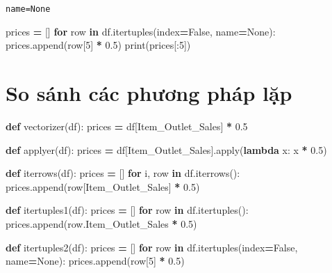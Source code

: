 \documentclass[
]{book}
\newenvironment{Shaded}{\begin{snugshade}}{\end{snugshade}}
\newcommand{\BuiltInTok}[1]{#1}
\newcommand{\ControlFlowTok}[1]{\textcolor[rgb]{0.13,0.29,0.53}{\textbf{#1}}}
\newcommand{\DecValTok}[1]{\textcolor[rgb]{0.00,0.00,0.81}{#1}}
\newcommand{\FloatTok}[1]{\textcolor[rgb]{0.00,0.00,0.81}{#1}}
\newcommand{\KeywordTok}[1]{\textcolor[rgb]{0.13,0.29,0.53}{\textbf{#1}}}
\newcommand{\NormalTok}[1]{#1}
\newcommand{\OperatorTok}[1]{\textcolor[rgb]{0.81,0.36,0.00}{\textbf{#1}}}
\newcommand{\StringTok}[1]{\textcolor[rgb]{0.31,0.60,0.02}{#1}}
\newcommand{\VariableTok}[1]{\textcolor[rgb]{0.00,0.00,0.00}{#1}}
\begin{document}
\texttt{name=None}

\begin{Shaded}
\begin{Highlighting}[]
\NormalTok{prices }\OperatorTok{=}\NormalTok{ []}
\ControlFlowTok{for}\NormalTok{ row }\KeywordTok{in}\NormalTok{ df.itertuples(index}\OperatorTok{=}\VariableTok{False}\NormalTok{, name}\OperatorTok{=}\VariableTok{None}\NormalTok{):}
\NormalTok{    prices.append(row[}\DecValTok{5}\NormalTok{] }\OperatorTok{*} \FloatTok{0.5}\NormalTok{)}
\BuiltInTok{print}\NormalTok{(prices[:}\DecValTok{5}\NormalTok{])}
\end{Highlighting}
\end{Shaded}

\section{So sánh các phương pháp lặp}\label{so-suxe1nh-cuxe1c-phux1b0ux1a1ng-phuxe1p-lux1eb7p}

\begin{Shaded}
\begin{Highlighting}[]

\KeywordTok{def}\NormalTok{ vectorizer(df):}
\NormalTok{    prices }\OperatorTok{=}\NormalTok{ df[}\StringTok{\textquotesingle{}Item\_Outlet\_Sales\textquotesingle{}}\NormalTok{] }\OperatorTok{*} \FloatTok{0.5}

\KeywordTok{def}\NormalTok{ applyer(df):}
\NormalTok{    prices }\OperatorTok{=}\NormalTok{ df[}\StringTok{\textquotesingle{}Item\_Outlet\_Sales\textquotesingle{}}\NormalTok{].}\BuiltInTok{apply}\NormalTok{(}\KeywordTok{lambda}\NormalTok{ x: x }\OperatorTok{*} \FloatTok{0.5}\NormalTok{)}

\KeywordTok{def}\NormalTok{ iterrows(df):}
\NormalTok{    prices }\OperatorTok{=}\NormalTok{ []}
    \ControlFlowTok{for}\NormalTok{ i, row }\KeywordTok{in}\NormalTok{ df.iterrows():}
\NormalTok{        prices.append(row[}\StringTok{\textquotesingle{}Item\_Outlet\_Sales\textquotesingle{}}\NormalTok{] }\OperatorTok{*} \FloatTok{0.5}\NormalTok{)}

\KeywordTok{def}\NormalTok{ itertuples1(df):}
\NormalTok{    prices }\OperatorTok{=}\NormalTok{ []}
    \ControlFlowTok{for}\NormalTok{ row }\KeywordTok{in}\NormalTok{ df.itertuples():}
\NormalTok{        prices.append(row.Item\_Outlet\_Sales }\OperatorTok{*} \FloatTok{0.5}\NormalTok{)}

\KeywordTok{def}\NormalTok{ itertuples2(df):}
\NormalTok{    prices }\OperatorTok{=}\NormalTok{ []}
    \ControlFlowTok{for}\NormalTok{ row }\KeywordTok{in}\NormalTok{ df.itertuples(index}\OperatorTok{=}\VariableTok{False}\NormalTok{, name}\OperatorTok{=}\VariableTok{None}\NormalTok{):}
\NormalTok{        prices.append(row[}\DecValTok{5}\NormalTok{] }\OperatorTok{*} \FloatTok{0.5}\NormalTok{)}
\end{Highlighting}
\end{Shaded}
\end{document}

